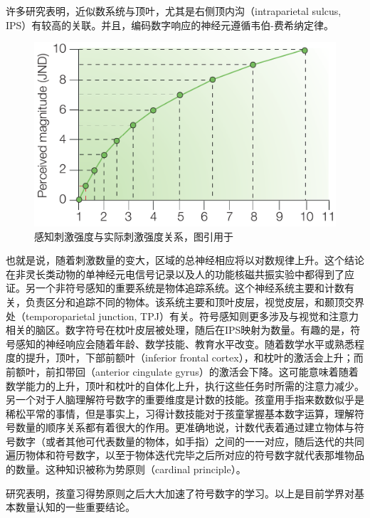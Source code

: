 \documentclass[bachelor, comfort]{shtthesis}
\begin{document}
许多研究表明，近似数系统与顶叶，尤其是右侧顶内沟（intraparietal sulcus, IPS）有较高的关联\cite{num14,num13}。并且，编码数字响应的神经元遵循韦伯-费希纳定律\cite{num16,num15}。

\begin{figure}[ht]
	\centering
	\includegraphics[width=0.60\linewidth]{figures/weber.png}
	\caption{\label{fig:weber} 感知刺激强度与实际刺激强度关系，图引用于\cite{num15}}
\end{figure}


也就是说，随着刺激数量的变大，区域的总神经相应将以对数规律上升。这个结论在非灵长类动物的单神经元电信号记录以及人的功能核磁共振实验中都得到了应证\cite{num18,num17}。另一个非符号感知的重要系统是物体追踪系统。这个神经系统主要和计数有关，负责区分和追踪不同的物体。该系统主要和顶叶皮层，视觉皮层，和颞顶交界处（temporoparietal junction, TPJ）有关\cite{num20,num19}。符号感知则更多涉及与视觉和注意力相关的脑区。数字符号在枕叶皮层被处理，随后在IPS映射为数量\cite{num21}。有趣的是，符号感知的神经响应会随着年龄、数学技能、教育水平改变。随着数学水平或熟悉程度的提升，顶叶，下部前额叶（inferior frontal cortex），和枕叶的激活会上升\cite{core95,core14,core94,core30}；而前额叶，前扣带回（anterior cingulate gyrus）的激活会下降\cite{core95,core87,core30}。这可能意味着随着数学能力的上升，顶叶和枕叶的自体化上升\cite{num22}，执行这些任务时所需的注意力减少。另一个对于人脑理解符号数字的重要维度是计数的技能。孩童用手指来数数似乎是稀松平常的事情，但是事实上，习得计数技能对于孩童掌握基本数字运算，理解符号数量的顺序关系都有着很大的作用\cite{num23}。更准确地说，计数代表着通过建立物体与符号数字（或者其他可代表数量的物体，如手指）之间的一一对应，随后迭代的共同遍历物体和符号数字，以至于物体迭代完毕之后所对应的符号数字就代表那堆物品的数量。这种知识被称为势原则（cardinal principle）\cite{num24}。

研究表明，孩童习得势原则之后大大加速了符号数字的学习\cite{num25}。以上是目前学界对基本数量认知的一些重要结论。
\end{document}

